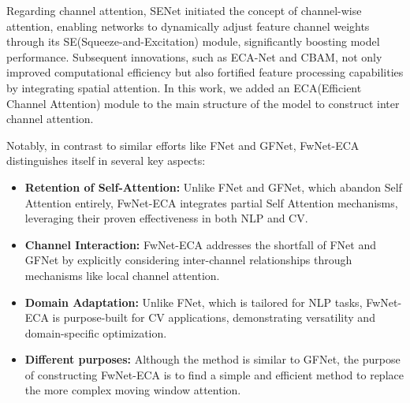 Regarding channel attention, SENet\cite{hu2018squeeze} initiated the concept of channel-wise attention, enabling networks to dynamically adjust feature channel weights through its SE(Squeeze-and-Excitation) module, significantly boosting model performance. Subsequent innovations, such as ECA-Net\cite{wang2020eca} and CBAM\cite{woo2018cbam}, not only improved computational efficiency but also fortified feature processing capabilities by integrating spatial attention. In this work, we added an ECA(Efficient Channel Attention) module to the main structure of the model to construct inter channel attention.

Notably, in contrast to similar efforts like FNet and GFNet, FwNet-ECA distinguishes itself in several key aspects:
\begin{itemize}
\item \textbf{Retention of Self-Attention:} Unlike FNet and GFNet, which abandon Self Attention entirely, FwNet-ECA integrates partial Self Attention mechanisms, leveraging their proven effectiveness in both NLP and CV.
\item 	\textbf{Channel Interaction:} FwNet-ECA addresses the shortfall of FNet and GFNet by explicitly considering inter-channel relationships through mechanisms like local channel attention.
\item 	\textbf{Domain Adaptation:} Unlike FNet, which is tailored for NLP tasks, FwNet-ECA is purpose-built for CV applications, demonstrating versatility and domain-specific optimization.
\item 	\textbf{Different purposes:} Although the method is similar to GFNet, the purpose of constructing FwNet-ECA is to find a simple and efficient method to replace the more complex moving window attention.
\end{itemize}